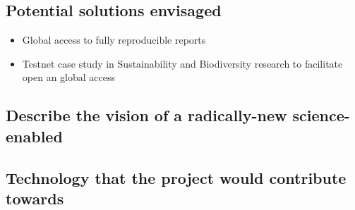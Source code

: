 \documentclass[12pt, a4paper]{article} %
\begin{document}
\subsection{Potential solutions envisaged}
\begin{itemize}
\item Global access to fully reproducible reports
\item Testnet case study in Sustainability and Biodiversity research to facilitate open an global access  
\end{itemize}

\subsection{Describe the vision of a radically-new science-enabled}


\subsection{Technology that the project would contribute towards}
\end{document}
